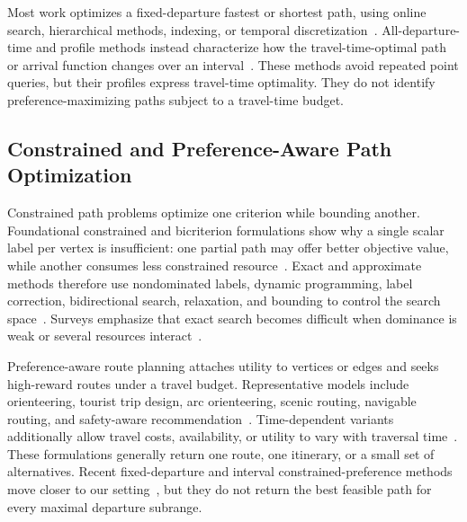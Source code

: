 \documentclass[a4paper,fleqn]{cas-dc}
\begin{document}
Most work optimizes a fixed-departure fastest or shortest path, using online search, hierarchical methods, indexing, or temporal discretization~\cite{tdsp-edbt08,DemiryurekKSR11,tdsp-2011itsc,tdsp-2014its,tdsp-2014bigdata}. All-departure-time and profile methods instead characterize how the travel-time-optimal path or arrival function changes over an interval~\cite{GunturiSY15,KolovskyJezekKolingerova2019}. These methods avoid repeated point queries, but their profiles express travel-time optimality. They do not identify preference-maximizing paths subject to a travel-time budget.

\subsection{Constrained and Preference-Aware Path Optimization}
\label{subsec:rw_constrained_preference}

Constrained path problems optimize one criterion while bounding another. Foundational constrained and bicriterion formulations show why a single scalar label per vertex is insufficient: one partial path may offer better objective value, while another consumes less constrained resource~\cite{joksch1966shortest,handler1980dual,hansen1980bicriterion}. Exact and approximate methods therefore use nondominated labels, dynamic programming, label correction, bidirectional search, relaxation, and bounding to control the search space~\cite{skriver2000label,dumitrescu2003weight,feillet2004elementary,righini2006symmetry,lozano2013exact,barrett2019bidirectional}. Surveys emphasize that exact search becomes difficult when dominance is weak or several resources interact~\cite{garroppo2010survey,pugliese2013survey}.

Preference-aware route planning attaches utility to vertices or edges and seeks high-reward routes under a travel budget. Representative models include orienteering, tourist trip design, arc orienteering, scenic routing, navigable routing, and safety-aware recommendation~\cite{golden1987orienteering,vansteenwegen2011orienteering,Gunawan2016OPSurvey,Li2005TripPlanning,Gavalas2014TTDPSurvey,Riff2024PreferenceTTDP,Verbeeck2014AOPCycle,Gavalas2015AOPApprox,Lu2015Scenic,Kaur2021Navigable,Aljubayrin2015SafeZones,Kaur2021SafeNavigation,Islam2023PersonalizedSafe,Das2024SunGlare,Li2018EnergyEfficient,Makhdomi2023GreenerFairerSurvey}. Time-dependent variants additionally allow travel costs, availability, or utility to vary with traversal time~\cite{Verbeeck2014TDOP,Gunawan2014TDOP,Gavalas2014TDTOPTW,lu2017scenic,Chen2019MostBeautiful,Gao2019TwoFoldWCNC,Chen2021TwoTDPathPlanner}. These formulations generally return one route, one itinerary, or a small set of alternatives. Recent fixed-departure and interval constrained-preference methods move closer to our setting~\cite{dutta2024tdcpo,td-cpo-2025-interval,DuttaGunturi2026PCMax}, but they do not return the best feasible path for every maximal departure subrange.
\end{document}
